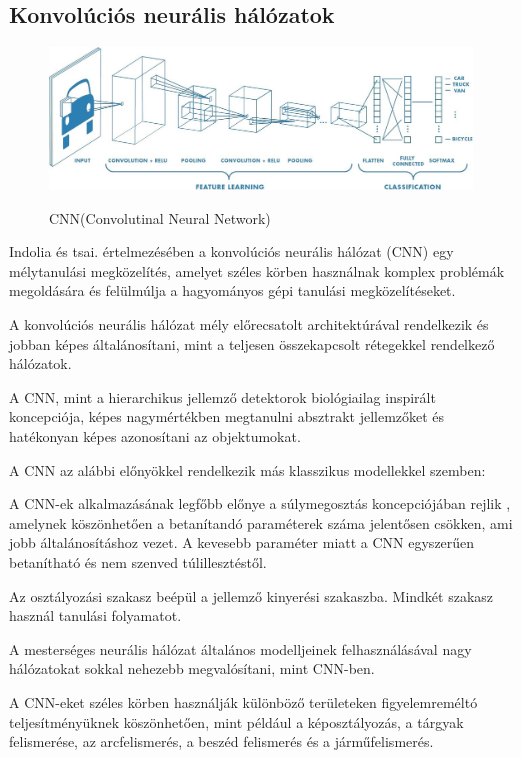 \documentclass[12pt,a4]{article}
\begin{document}
	\subsection{Konvolúciós neurális hálózatok}
	\begin{figure}[h]	
		\centering
		\includegraphics[width=1\linewidth]{CNN}
        \label{fig:cnn}
		\caption{CNN(Convolutinal Neural Network)}
	\end{figure}
 
	\cite{CNN}Indolia és tsai. értelmezésében a konvolúciós neurális hálózat (CNN) egy
	mélytanulási megközelítés, amelyet széles körben használnak komplex problémák megoldására és felülmúlja a hagyományos gépi
	tanulási megközelítéseket.
	
	A konvolúciós neurális hálózat mély előrecsatolt architektúrával rendelkezik és jobban képes általánosítani, mint a teljesen összekapcsolt rétegekkel rendelkező hálózatok.
	
	A CNN, mint a hierarchikus jellemző detektorok biológiailag inspirált koncepciója, képes nagymértékben megtanulni
	absztrakt jellemzőket és hatékonyan képes azonosítani az objektumokat.
	
	A CNN az alábbi előnyökkel rendelkezik más klasszikus modellekkel szemben:
	
	  A CNN-ek alkalmazásának legfőbb előnye a súlymegosztás koncepciójában rejlik
	, amelynek köszönhetően a betanítandó paraméterek száma jelentősen csökken, ami jobb általánosításhoz vezet. 
	A kevesebb paraméter miatt a CNN egyszerűen betanítható és nem szenved túlillesztéstől.
	
	Az osztályozási szakasz beépül a jellemző kinyerési szakaszba. Mindkét szakasz használ tanulási folyamatot.
	
	   A mesterséges neurális hálózat általános modelljeinek felhasználásával nagy hálózatokat sokkal nehezebb megvalósítani,
	mint CNN-ben.
	
	A CNN-eket széles körben használják különböző területeken figyelemreméltó
	teljesítményüknek köszönhetően, mint például a képosztályozás, a tárgyak felismerése, az arcfelismerés, a beszéd
	felismerés és a járműfelismerés.
	
\end{document}
